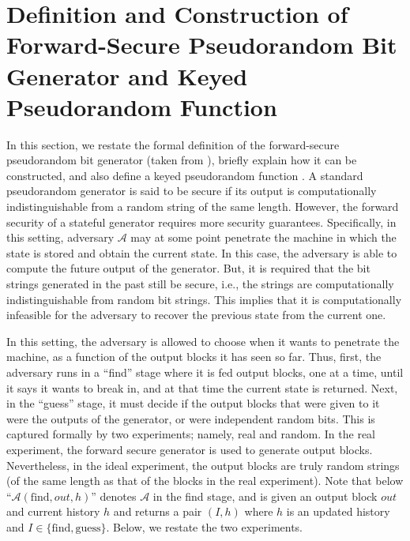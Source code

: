 

\section{Definition and Construction of Forward-Secure Pseudorandom Bit Generator and Keyed Pseudorandom Function}\label{app:def-FS-PRG}

In this section, we restate the formal definition of the forward-secure pseudorandom bit generator (taken from \cite{BellareY03}), briefly explain how it can be constructed, and also define a keyed pseudorandom function \prf. A standard pseudorandom generator is said to be secure if its output is computationally indistinguishable from a random string of the same length. However, the forward security of a stateful generator requires more security guarantees. Specifically, in this setting,  adversary $\mathcal{A}$ may at some point penetrate the machine in which the state is stored and obtain the current state. In this case, the adversary is able to compute the future output of the generator. But, it is required that the bit strings generated in the past still be secure, i.e., the strings are computationally indistinguishable from random bit strings. This implies that it is computationally infeasible for the adversary to recover the previous state from the current one. 





In this setting, the adversary is allowed to choose when it wants to penetrate the machine, as a function of the output blocks it has seen so far. Thus, first, the adversary runs in a ``find'' stage where it is fed output blocks, one at a time, until it says it wants to break in, and at that time the current state is returned.  Next, in the ``guess'' stage, it must decide if the output blocks that were given to it were the outputs of the generator, or were independent random bits. This is captured formally by two experiments; namely, real and random. In the real experiment, the forward secure generator is used to generate output blocks. Nevertheless, in the ideal experiment, the output blocks are truly random strings (of the same length as that of the blocks in the real experiment). Note that below ``$\mathcal{A}(\text{find}, out, h)$'' denotes $\mathcal{A}$ in the find stage, and is given an output block $out$ and current history $h$ and returns a pair $(I, h)$ where $h$ is an updated history and $I \in\{\text{find}, \text{guess}\}$. Below, we restate the two experiments. 







